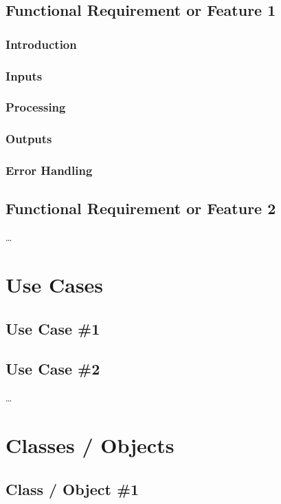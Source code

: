 \documentclass{scrreprt}
\begin{document}
    \subsection{Functional Requirement or Feature 1}

      \subsubsection{Introduction}

      \subsubsection{Inputs}

      \subsubsection{ Processing}

      \subsubsection{Outputs}

      \subsubsection{Error Handling}

    \subsection{ Functional Requirement or Feature 2}
…
  \section{Use Cases}

    \subsection{Use Case \#1}

    \subsection{Use Case \#2}
…
  \section{ Classes / Objects}

    \subsection{Class / Object \#1}
\end{document}

